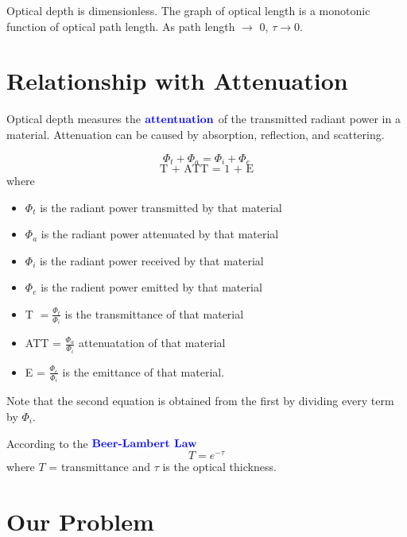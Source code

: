 \documentclass[12pt]{scrartcl}
\begin{document}
\begin{note}
    Optical depth is dimensionless. The graph of optical length is a monotonic  function of optical path length. As path length $\to$ 0, $\tau \to 0$.
\end{note}

\section{Relationship with Attenuation}

\begin{definition}
    Optical depth measures the $\textbf{\color{blue} attentuation}$ of the transmitted radiant power in a material. Attenuation can be caused by absorption, reflection, and scattering.
\end{definition}

\begin{lemma}
\[\Phi_t + \Phi_a = \Phi_i + \Phi_e\]
\[\text{T + ATT = 1 + E}\]
where
\begin{itemize}
    \item $\Phi_t$ is the radiant power transmitted by that material
    \item $\Phi_a$ is the radiant power attenuated by that material
    \item $\Phi_i$ is the radiant power received by that material
    \item $\Phi_e$ is the radient power emitted by that material
    \item T $= \frac{\Phi_t}{\Phi_i}$ is the transmittance of that material
    \item ATT = $\frac{\Phi_a}{\Phi_i}$ attenuatation of that material
    \item E = $\frac{\Phi_e}{\Phi_i}$ is the emittance of that material.
\end{itemize}
Note that the second equation is obtained from the first by dividing every term by $\Phi_i$.
\end{lemma}

\begin{definition}
    According to the $\textbf{\color{blue} Beer-Lambert Law}$
\[T = e^{-\tau}\]
where $T$ = transmittance and $\tau$ is the optical thickness.
\end{definition}

\section{Our Problem}
\end{document}
